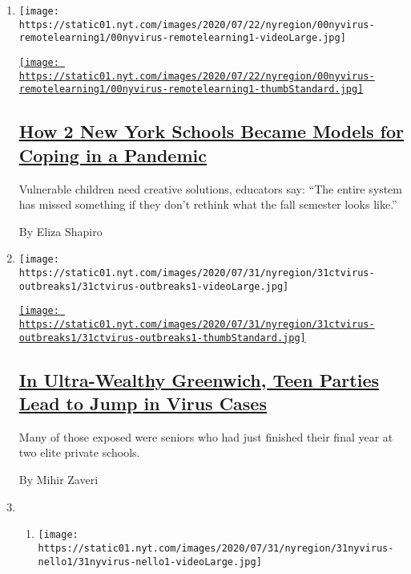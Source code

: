 \begin{enumerate}
\def\labelenumi{\arabic{enumi}.}
\item
  \texttt{[image: https://static01.nyt.com/images/2020/07/22/nyregion/00nyvirus-remotelearning1/00nyvirus-remotelearning1-videoLarge.jpg]}

  \href{/2020/07/31/nyregion/nyc-homeless-children-school.html}{\texttt{[image: https://static01.nyt.com/images/2020/07/22/nyregion/00nyvirus-remotelearning1/00nyvirus-remotelearning1-thumbStandard.jpg]}}

  \hypertarget{how-2-new-york-schools-became-models-for-coping-in-a-pandemic}{%
  \subsection{\texorpdfstring{\href{/2020/07/31/nyregion/nyc-homeless-children-school.html}{How
  2 New York Schools Became Models for Coping in a
  Pandemic}}{How 2 New York Schools Became Models for Coping in a Pandemic}}\label{how-2-new-york-schools-became-models-for-coping-in-a-pandemic}}

  Vulnerable children need creative solutions, educators say: ``The
  entire system has missed something if they don't rethink what the fall
  semester looks like.''

  By Eliza Shapiro
\item
  \texttt{[image: https://static01.nyt.com/images/2020/07/31/nyregion/31ctvirus-outbreaks1/31ctvirus-outbreaks1-videoLarge.jpg]}

  \href{/2020/07/31/nyregion/greenwich-ct-coronavirus-covid-parties.html}{\texttt{[image: https://static01.nyt.com/images/2020/07/31/nyregion/31ctvirus-outbreaks1/31ctvirus-outbreaks1-thumbStandard.jpg]}}

  \hypertarget{in-ultra-wealthy-greenwich-teen-parties-lead-to-jump-in-virus-cases}{%
  \subsection{\texorpdfstring{\href{/2020/07/31/nyregion/greenwich-ct-coronavirus-covid-parties.html}{In
  Ultra-Wealthy Greenwich, Teen Parties Lead to Jump in Virus
  Cases}}{In Ultra-Wealthy Greenwich, Teen Parties Lead to Jump in Virus Cases}}\label{in-ultra-wealthy-greenwich-teen-parties-lead-to-jump-in-virus-cases}}

  Many of those exposed were seniors who had just finished their final
  year at two elite private schools.

  By Mihir Zaveri
\item
  \begin{enumerate}
  \def\labelenumii{\arabic{enumii}.}
  \item
    \texttt{[image: https://static01.nyt.com/images/2020/07/31/nyregion/31nyvirus-nello1/31nyvirus-nello1-videoLarge.jpg]}


\end{enumerate}
\end{enumerate}
